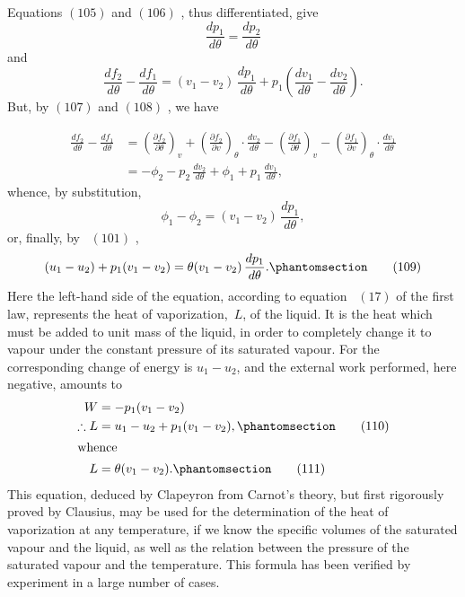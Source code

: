 \documentclass[12pt]{book}[2005/09/16]
\newcommand{\Tag}[1]{%
  \phantomsection\label{eqn:#1}\tag*{\ensuremath{#1}}%
}
\newcommand{\Eq}[1]{%
  \hyperref[eqn:#1]{\ensuremath{#1}}%
}
\newcommand{\PageSep}[1]{\ignorespaces}
\newcommand{\dd}{\partial}
\begin{document}
Equations \Eq{(105)} and \Eq{(106)}, thus differentiated, give
\[
\frac{dp_{1}}{d\theta} = \frac{dp_{2}}{d\theta}
\]
and
\[
\frac{df_{2}}{d\theta} - \frac{df_{1}}{d\theta}
  = (v_{1} - v_{2})\, \frac{dp_{1}}{d\theta} + p_{1}\left(\frac{dv_{1}}{d\theta} - \frac{dv_{2}}{d\theta}\right).
\]
But, by \Eq{(107)} and \Eq{(108)}, we have
\iffalse
\begin{align*}
\frac{df_{2}}{d\theta} - \frac{df_{1}}{d\theta}
  &\begin{aligned}[t]
     &= \left(\frac{\dd f_{2}}{\dd \theta}\right)_{v} + \left(\frac{\dd f_{2}}{\dd v}\right)_{\theta} · \frac{dv_{2}}{d\theta} \\
     &- \left(\frac{\dd f_{1}}{\dd \theta}\right)_{v} - \left(\frac{\dd f_{1}}{\dd v}\right)_{\theta} · \frac{dv_{1}}{d\theta}
   \end{aligned} \\
  &= -\phi_{2} - p_{2}\, \frac{dv_{2}}{d\theta} + \phi_{1} + p_{1}\, \frac{dv_{1}}{d\theta},
\end{align*}
\fi
\begin{align*}
\frac{df_{2}}{d\theta} - \frac{df_{1}}{d\theta}
  &= \left(\frac{\dd f_{2}}{\dd \theta}\right)_{v} \!\!+ \left(\frac{\dd f_{2}}{\dd v}\right)_{\theta} · \frac{dv_{2}}{d\theta}
   - \left(\frac{\dd f_{1}}{\dd \theta}\right)_{v} \!\!- \left(\frac{\dd f_{1}}{\dd v}\right)_{\theta} · \frac{dv_{1}}{d\theta} \\
  &= -\phi_{2} - p_{2}\, \frac{dv_{2}}{d\theta} + \phi_{1} + p_{1}\, \frac{dv_{1}}{d\theta},
\end{align*}
whence, by substitution,
\[
\phi_{1} - \phi_{2} = (v_{1} - v_{2})\, \frac{dp_{1}}{d\theta},
\]
or, finally, by~\Eq{(101)},
\[
(u_{1} - u_{2}) + p_{1} (v_{1} - v_{2}) = \theta (v_{1} - v_{2})\, \frac{dp_{1}}{d\theta}.
\Tag{(109)}
\]
Here the left-hand side of the equation, according to
equation~\Eq{(17)} of the first law, represents the heat of
vaporization,~$L$, of the liquid. It is the heat which must
be added to unit mass of the liquid, in order to completely
change it to vapour under the constant pressure of its
saturated vapour. For the corresponding change of energy
is $u_{1} - u_{2}$, and the external work performed, here negative,
amounts to
\begin{align*}
W &= -p_{1}(v_{1} - v_{2}) \\
\therefore
L &= u_{1} - u_{2} + p_{1}(v_{1} - v_{2}),
\Tag{(110)} \\
\intertext{whence}
L &= \theta (v_{1} - v_{2}).
\Tag{(111)}
\end{align*}
This equation, deduced by Clapeyron from Carnot's theory,
%
but first rigorously proved by Clausius, may be used
for the determination of the heat of vaporization at
any temperature, if we know the specific volumes of the
saturated vapour and the liquid, as well as the relation
between the pressure of the saturated vapour and the
\PageSep{143}
temperature. This formula has been verified by experiment
in a large number of cases.
\end{document}
